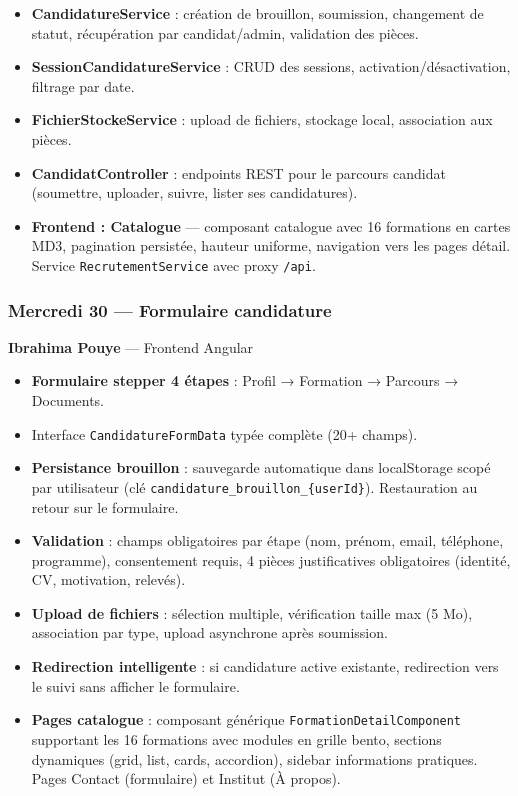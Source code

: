 \documentclass[a4paper,12pt,french]{article}
\begin{document}
\begin{itemize}
    \item \textbf{CandidatureService} : création de brouillon, soumission, changement de statut, récupération par candidat/admin, validation des pièces.
    \item \textbf{SessionCandidatureService} : CRUD des sessions, activation/désactivation, filtrage par date.
    \item \textbf{FichierStockeService} : upload de fichiers, stockage local, association aux pièces.
    \item \textbf{CandidatController} : endpoints REST pour le parcours candidat (soumettre, uploader, suivre, lister ses candidatures).
    \item \textbf{Frontend : Catalogue} — composant catalogue avec 16 formations en cartes MD3, pagination persistée, hauteur uniforme, navigation vers les pages détail. Service \texttt{RecrutementService} avec proxy \texttt{/api}.
\end{itemize}

\subsubsection{Mercredi 30 — Formulaire candidature}

\begin{assignmentbox}
\textbf{Ibrahima Pouye} — Frontend Angular
\end{assignmentbox}

\begin{itemize}
    \item \textbf{Formulaire stepper 4 étapes} : Profil → Formation → Parcours → Documents.
    \item Interface \texttt{CandidatureFormData} typée complète (20+ champs).
    \item \textbf{Persistance brouillon} : sauvegarde automatique dans localStorage scopé par utilisateur (clé \texttt{candidature\_brouillon\_\{userId\}}). Restauration au retour sur le formulaire.
    \item \textbf{Validation} : champs obligatoires par étape (nom, prénom, email, téléphone, programme), consentement requis, 4 pièces justificatives obligatoires (identité, CV, motivation, relevés).
    \item \textbf{Upload de fichiers} : sélection multiple, vérification taille max (5 Mo), association par type, upload asynchrone après soumission.
    \item \textbf{Redirection intelligente} : si candidature active existante, redirection vers le suivi sans afficher le formulaire.
    \item \textbf{Pages catalogue} : composant générique \texttt{FormationDetailComponent} supportant les 16 formations avec modules en grille bento, sections dynamiques (grid, list, cards, accordion), sidebar informations pratiques. Pages Contact (formulaire) et Institut (À propos).
\end{itemize}
\end{document}
